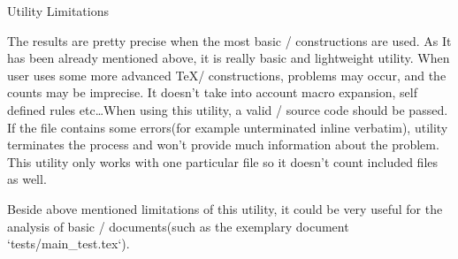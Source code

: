 \sec Utility Limitations

The results are pretty precise when the most basic \OpTeX/ constructions are used.
As It has been already mentioned above, it is really basic and lightweight utility.
When user uses some more advanced \TeX/ constructions, problems may occur, and the counts may be imprecise.
It doesn't take into account macro expansion, self defined rules etc\dots When using this utility, a valid \OpTeX/ source code should be passed.
If the file contains some errors(for example unterminated inline verbatim), utility terminates the process and won't provide much information about the problem.
This utility only works with one particular file so it doesn't count included files as well.

Beside above mentioned limitations of this utility, it could be very useful for the analysis of basic \OpTeX/ documents(such as the exemplary document {\Blue `tests/main_test.tex`}).

\bye
